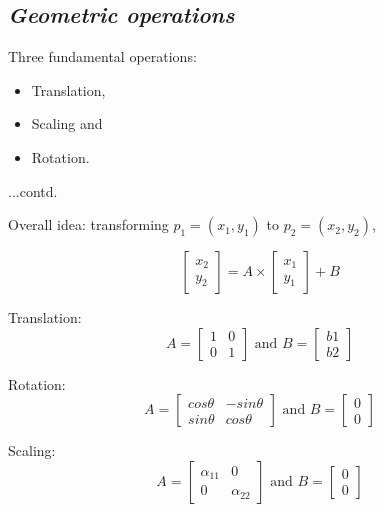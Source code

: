 \documentclass{response}
\begin{document}
\newpage

\subsection*{\Huge\em Geometric operations}
\bigskip


{\large 


Three fundamental operations:

\begin{itemize}
\item Translation,
\item Scaling and 
\item Rotation.
\end{itemize}





\newpage

\bigskip

...contd.

Overall idea: transforming $p_1 = (x_1, y_1)$ to $p_2 = (x_2, y_2)$,

 \[
  \left[ {\begin{array}{c}
   x_2 \\    y_2  \end{array} } \right]
= 
A \times 
  \left[ {\begin{array}{c}
   x_1 \\    y_1  \end{array} } \right]
   +
   B
\]

Translation: 
\[
A = \left[ 
{\begin{array}{cc}
   1 & 0  \\   0 & 1 \end{array} }\right]
   \mbox{ and }
B =
\left[ 
{\begin{array}{cc}
   b1  \\   b2 \end{array} }\right]   
\]

Rotation: 
\[
A = \left[ 
{\begin{array}{cc}
   cos\theta & -sin\theta  \\  sin\theta & cos\theta \end{array} }\right]
   \mbox{ and }
B =
\left[ 
{\begin{array}{cc}
   0  \\   0 \end{array} }\right]   
\]

Scaling: 
\[
A = \left[ 
{\begin{array}{cc}
   \alpha_{11} & 0  \\  0 & \alpha_{22} \end{array} }\right]
   \mbox{ and }
B =
\left[ 
{\begin{array}{cc}
   0  \\   0 \end{array} }\right]   
\]



}
\end{document}
